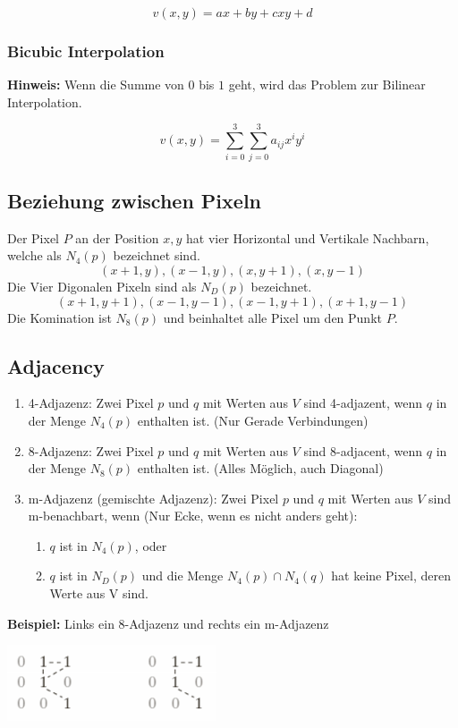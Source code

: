 \[
v(x, y) = ax + by + cxy + d
\]

\subsubsection{Bicubic Interpolation}
\textbf{Hinweis:} Wenn die Summe von $0$ bis $1$ geht, wird das Problem zur Bilinear Interpolation.

\[
v(x, y) = \sum_{i=0}^{3}\sum_{j=0}^{3}a_{ij}x^iy^i
\]

\subsection{Beziehung zwischen Pixeln}
Der Pixel $P$ an der Position $x,y$ hat vier Horizontal und Vertikale Nachbarn, welche als $N_4(p)$ bezeichnet sind.
\[
(x+1, y), (x-1, y), (x, y+1), (x,y-1)
\]
Die Vier Digonalen Pixeln sind als $N_D(p)$ bezeichnet.
\[
(x+1, y+1), (x-1, y-1), (x-1, y+1), (x+1,y-1)
\]
Die Komination ist $N_8(p)$ und beinhaltet alle Pixel um den Punkt $P$.

\subsection{Adjacency}
\begin{enumerate}
	\item 4-Adjazenz: Zwei Pixel $p$ und $q$ mit Werten aus $V$ sind 4-adjazent, wenn $q$ in der Menge $N_4(p)$ enthalten ist.  (Nur Gerade Verbindungen)
	\item 8-Adjazenz: Zwei Pixel $p$ und $q$ mit Werten aus $V$ sind 8-adjacent, wenn $q$ in der Menge $N_8(p)$ enthalten ist. (Alles Möglich, auch Diagonal)
	\item m-Adjazenz (gemischte Adjazenz): Zwei Pixel $p$ und $q$ mit Werten aus $V$ sind m-benachbart, wenn (Nur Ecke, wenn es nicht anders geht):
	\begin{enumerate}
		\item  $q$ ist in $N_4(p)$, oder
		\item  $q$ ist in $N_D(p)$ und die Menge $N_4(p) \cap N_4(q)$ hat keine Pixel, deren Werte aus V sind.
	\end{enumerate}
\end{enumerate}

\textbf{Beispiel:} Links ein 8-Adjazenz und rechts ein m-Adjazenz
\begin{center}
	\includegraphics[width=0.4\columnwidth]{Images/adjacency}
\end{center}


